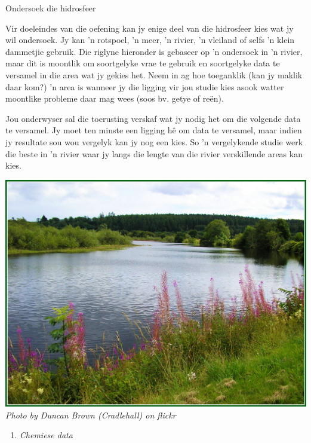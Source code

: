             \begin{Investigation}{Ondersoek die hidrosfeer }
            \nopagebreak 
\begin{minipage}{.5\textwidth}
            \label{m38138*uid4}
Vir doeleindes van die oefening kan jy enige deel van die hidrosfeer kies wat jy wil ondersoek. Jy kan  'n rotspoel,  'n meer,  'n rivier,  'n vleiland of selfs  'n klein dammetjie gebruik. Die riglyne hieronder is gebaseer op  'n ondersoek in  'n rivier, maar dit is moontlik om soortgelyke vrae te gebruik en soortgelyke data te versamel in die area wat jy gekies het. Neem in ag hoe toeganklik (kan jy maklik daar kom?)  'n area is wanneer jy die ligging vir jou studie kies asook watter moontlike probleme daar mag wees (soos bv. getye of re\"{e}n).\par
\label{m38138*uid5}
Jou onderwyser sal die toerusting verskaf wat jy nodig het om die volgende data te versamel. Jy moet ten minste een ligging h\^{e} om data te versamel, maar indien jy resultate sou wou vergelyk kan jy nog een kies. So  'n vergelykende studie werk die beste in  'n rivier waar jy langs die lengte van die rivier verskillende areas kan kies. \par
\end{minipage}
\begin{minipage}{.5\textwidth}
\begin{center}
 \includegraphics[width=.8\textwidth]{photos/DuncanBrown(Cradlehall).jpg} \\
\textsl{Photo by Duncan Brown (Cradlehall) on flickr}
\end{center}
\end{minipage}
\label{m38138*id334646}\begin{enumerate}[noitemsep, label=\textbf{\arabic*}. ] 
            \label{m38138*uid6}\item \textsl{Chemiese data}

\end{enumerate}
\end{Investigation}
